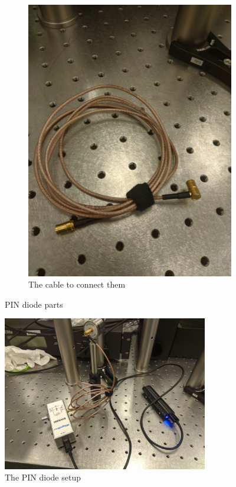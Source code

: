 \documentclass[a4paper, 10pt]{article}
\begin{document}
\begin{figure}[h]
\begin{subfigure}{0.4\textwidth}
        \includegraphics[width=\textwidth,angle=-90]{../images/pin-cable.jpg}
        \caption{The cable to connect them}
        \label{fig:pin-diode}
    \end{subfigure}
    \caption{PIN diode parts}
    \label{fig:pin-parts}
\end{figure}

\begin{figure}[H]
    \centering
    \includegraphics[width=0.8\textwidth]{../images/pin-setup.jpg}
    \caption{The PIN diode setup}
    \label{fig:pin-setup}
\end{figure}
\end{document}
